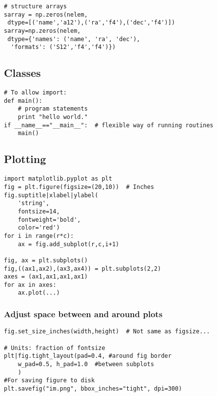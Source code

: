 \documentclass{article}
\begin{document}
\begin{multicols}{2}
\begin{lstlisting}
# structure arrays
sarray = np.zeros(nelem,
 dtype=[('name','a12'),('ra','f4'),('dec','f4')])
sarray=np.zeros(nelem,
 dtype={'names': ('name', 'ra', 'dec'),
  'formats': ('S12','f4','f4')})
\end{lstlisting}

\subsection{Classes}
\begin{lstlisting}
# To allow import:
def main():
    # program statements
    print "hello world."
if __name__=="__main__":  # flexible way of running routines
    main()
\end{lstlisting}

\newpage

\newpage
\subsection{Plotting}
\begin{lstlisting}
import matplotlib.pyplot as plt
fig = plt.figure(figsize=(20,10))  # Inches
fig.suptitle|xlabel|ylabel(
    'string',
    fontsize=14,
    fontweight='bold',
    color='red')
for i in range(r*c):
    ax = fig.add_subplot(r,c,i+1)

fig, ax = plt.subplots()
fig,((ax1,ax2),(ax3,ax4)) = plt.subplots(2,2)
axes = (ax1,ax1,ax1,ax1)
for ax in axes:
    ax.plot(...)
\end{lstlisting}

\subsubsection{Adjust space between and around plots}
\begin{lstlisting}
fig.set_size_inches(width,height)  # Not same as figsize...

# Units: fraction of fontsize
plt|fig.tight_layout(pad=0.4, #around fig border
    w_pad=0.5, h_pad=1.0  #between subplots
    )
#For saving figure to disk
plt.savefig("im.png", bbox_inches="tight", dpi=300)
\end{lstlisting}


\end{multicols}
\end{document}
